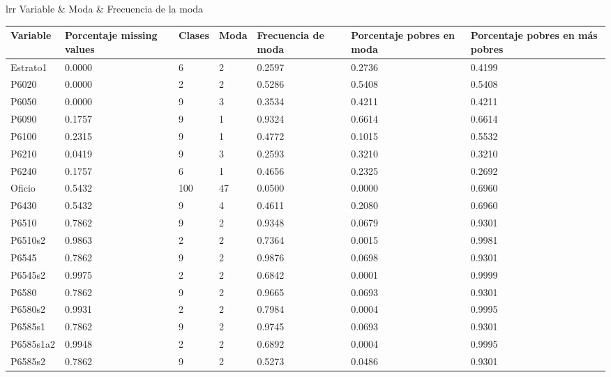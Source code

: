 \begin{table}[H]
\centering
\caption{Estadísticas descriptivas de variables discretas (personas)}
\label{tab:descriptiva_personas_discreta}
\begin{tabular}{lrr}
\toprule
Variable & Moda & Frecuencia de la moda \\
\midrule
\begin{table}[!ht]
    \centering
    \begin{tabular}{|l|l|l|l|l|l|l|}
    \hline
        Variable & Porcentaje missing values & Clases & Moda & Frecuencia de moda & Porcentaje pobres en moda & Porcentaje pobres en más pobres \\ \hline
        Estrato1 & 0.0000 & 6 & 2 & 0.2597 & 0.2736 & 0.4199 \\ \hline
        P6020 & 0.0000 & 2 & 2 & 0.5286 & 0.5408 & 0.5408 \\ \hline
        P6050 & 0.0000 & 9 & 3 & 0.3534 & 0.4211 & 0.4211 \\ \hline
        P6090 & 0.1757 & 9 & 1 & 0.9324 & 0.6614 & 0.6614 \\ \hline
        P6100 & 0.2315 & 9 & 1 & 0.4772 & 0.1015 & 0.5532 \\ \hline
        P6210 & 0.0419 & 9 & 3 & 0.2593 & 0.3210 & 0.3210 \\ \hline
        P6240 & 0.1757 & 6 & 1 & 0.4656 & 0.2325 & 0.2692 \\ \hline
        Oficio & 0.5432 & 100 & 47 & 0.0500 & 0.0000 & 0.6960 \\ \hline
        P6430 & 0.5432 & 9 & 4 & 0.4611 & 0.2080 & 0.6960 \\ \hline
        P6510 & 0.7862 & 9 & 2 & 0.9348 & 0.0679 & 0.9301 \\ \hline
        P6510s2 & 0.9863 & 2 & 2 & 0.7364 & 0.0015 & 0.9981 \\ \hline
        P6545 & 0.7862 & 9 & 2 & 0.9876 & 0.0698 & 0.9301 \\ \hline
        P6545s2 & 0.9975 & 2 & 2 & 0.6842 & 0.0001 & 0.9999 \\ \hline
        P6580 & 0.7862 & 9 & 2 & 0.9665 & 0.0693 & 0.9301 \\ \hline
        P6580s2 & 0.9931 & 2 & 2 & 0.7984 & 0.0004 & 0.9995 \\ \hline
        P6585s1 & 0.7862 & 9 & 2 & 0.9745 & 0.0693 & 0.9301 \\ \hline
        P6585s1a2 & 0.9948 & 2 & 2 & 0.6892 & 0.0004 & 0.9995 \\ \hline
        P6585s2 & 0.7862 & 9 & 2 & 0.5273 & 0.0486 & 0.9301 \\ \hline

\end{tabular}
\end{table}
\end{tabular}
\end{table}
